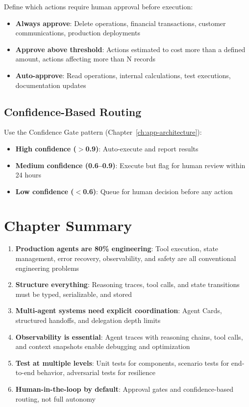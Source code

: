 Define which actions require human approval before execution:

\begin{itemize}[leftmargin=*]
    \item \textbf{Always approve}: Delete operations, financial transactions, customer communications, production deployments
    \item \textbf{Approve above threshold}: Actions estimated to cost more than a defined amount, actions affecting more than N records
    \item \textbf{Auto-approve}: Read operations, internal calculations, test executions, documentation updates
\end{itemize}

\subsection{Confidence-Based Routing}

Use the Confidence Gate pattern (Chapter~\ref{ch:app-architecture}):

\begin{itemize}[leftmargin=*]
    \item \textbf{High confidence ($>$0.9)}: Auto-execute and report results
    \item \textbf{Medium confidence (0.6--0.9)}: Execute but flag for human review within 24 hours
    \item \textbf{Low confidence ($<$0.6)}: Queue for human decision before any action
\end{itemize}


\section{Chapter Summary}

\begin{enumerate}[leftmargin=*]
    \item \textbf{Production agents are 80\% engineering}: Tool execution, state management, error recovery, observability, and safety are all conventional engineering problems
    \item \textbf{Structure everything}: Reasoning traces, tool calls, and state transitions must be typed, serializable, and stored
    \item \textbf{Multi-agent systems need explicit coordination}: Agent Cards, structured handoffs, and delegation depth limits
    \item \textbf{Observability is essential}: Agent traces with reasoning chains, tool calls, and context snapshots enable debugging and optimization
    \item \textbf{Test at multiple levels}: Unit tests for components, scenario tests for end-to-end behavior, adversarial tests for resilience
    \item \textbf{Human-in-the-loop by default}: Approval gates and confidence-based routing, not full autonomy
\end{enumerate}

